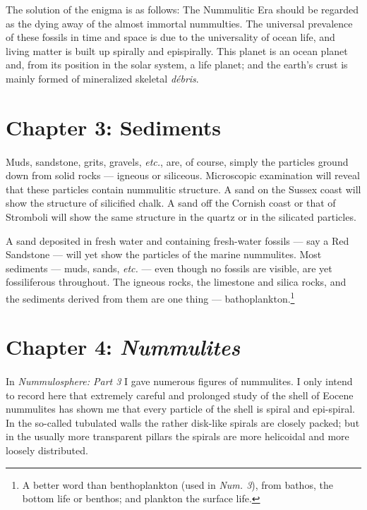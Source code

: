 \documentclass[a4paper, 12pt, oneside]{article}
\begin{document}
The solution of the enigma is as follows: The Nummulitic Era should be regarded as the dying away of the almost immortal nummulties. The universal prevalence of these fossils in time and space is due to the universality of ocean life, and living matter is built up spirally and epispirally. This planet is an ocean planet and, from its position in the solar system, a life planet; and the earth's crust is mainly formed of mineralized skeletal \emph{débris}.
\clearpage
\section{Chapter 3: Sediments}
\paragraph{}
Muds, sandstone, grits, gravels, \emph{etc.}, are, of course, simply the particles ground down from solid rocks --- igneous or siliceous. Microscopic examination will reveal that these particles contain nummulitic structure. A sand on the Sussex coast will show the structure of silicified chalk. A sand off the Cornish coast or that of Stromboli will show the same structure in the quartz or in the silicated particles.

A sand deposited in fresh water and containing fresh-water fossils --- say a Red Sandstone --- will yet show the particles of the marine nummulites. Most sediments --- muds, sands, \emph{etc.} --- even though no fossils are visible, are yet fossiliferous throughout. The igneous rocks, the limestone and silica rocks, and the sediments derived from them are one thing --- bathoplankton.\footnote{A better word than benthoplankton (used in \emph{Num. 3}), from bathos, the bottom life or benthos; and plankton the surface life.}
\clearpage
\section{Chapter 4: \emph{Nummulites}}
\paragraph{}
In \emph{Nummulosphere: Part 3} I gave numerous figures of nummulites. I only intend to record here that extremely careful and prolonged study of the shell of Eocene nummulites has shown me that every particle of the shell is spiral and epi-spiral. In the so-called tubulated walls the rather disk-like spirals are closely packed; but in the usually more transparent pillars the spirals are more helicoidal and more loosely distributed.
\end{document}
